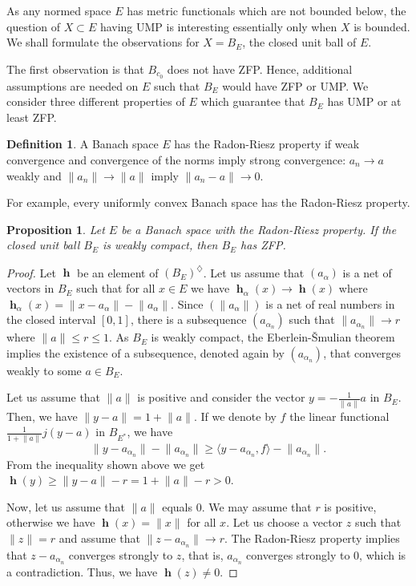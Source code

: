 \documentclass[a4paper,12pt]{article}
\newtheorem{proposition}[theorem]{Proposition}
\theoremstyle{definition}
\newtheorem{definition}[theorem]{Definition}
\numberwithin{equation}{section}
\newcommand{\norm}[1]{\lVert#1\rVert} %
\newcommand{\dpair}[2]{\langle#1, #2\rangle} %
\numberwithin{equation}{section}
\DeclareMathOperator{\h}{\mathbf{h}} %
\begin{document}
As any normed space $E$ has metric functionals which are not 
bounded below, the question of $X\subset E$ having UMP is 
interesting essentially only when $X$ is bounded. We shall 
formulate the observations for $X=B_E$, the closed unit ball 
of $E$. 

The first observation is that $B_{c_0}$ does not have ZFP. 
Hence, additional assumptions are needed on $E$ such that $B_E$ 
would have ZFP or UMP. We consider three different properties 
of $E$ which guarantee that $B_E$ has UMP or at least ZFP.   

\begin{definition}
A Banach space $E$ has the Radon-Riesz property if weak 
convergence and convergence of the norms imply strong 
convergence: $a_n \rightarrow a$ weakly and 
$\norm{a_n} \to \norm{a}$ imply $\norm{a_n - a} \to 0$.
\end{definition}

For example, every uniformly convex Banach space has the 
Radon-Riesz property.

\begin{proposition}
    Let $E$ be a Banach space with the Radon-Riesz property. 
    If the closed unit ball $B_E$ is weakly compact, then 
    $B_E$ has ZFP.
\end{proposition}

\begin{proof} 
Let $\h$ be an element of $(B_E)^\diamondsuit$. 
Let us assume that $(a_\alpha)$ is a net of 
vectors in $B_E$ such that for all $x \in E$ 
we have $\h_\alpha(x) \to \h(x)$ where 
$\h_\alpha(x) = 
\norm{x-a_\alpha}-\norm{a_\alpha}$. 
Since $(\norm{a_\alpha})$ is a net of real 
numbers in the closed interval $[0,1]$, there 
is a subsequence $(a_{\alpha_n})$ such that 
$\norm{a_{\alpha_n}} \to r$ where 
$\norm{a} \leq r \leq 1$.
As $B_E$ is weakly compact, the 
Eberlein-\v{S}mulian theorem \cite{Diestel1984}
implies the existence of a subsequence, denoted 
again by $(a_{\alpha_n})$, that converges 
weakly to some $a \in B_E$. 

Let us assume that $\norm{a}$ is positive 
and consider the vector 
$y= -\frac{1}{\norm{a}}a$ in $B_E$. Then, we 
have $\norm{y-a} = 1 + \norm{a}$. If we 
denote by $f$ the linear functional 
$\frac{1}{1+\norm{a}} j(y-a)$ in $B_{E^*}$, 
we have 
$$
\norm{y - a_{\alpha_n}} -\norm{a_{\alpha_n}}  
    \geq  \dpair{y - a_{\alpha_n}}{f} 
    - \norm{a_{\alpha_n}}.        
$$
From the inequality shown above we get  
$\h(y) \geq \norm{y-a} - r = 1 + \norm{a} - r > 0$.
 
Now, let us assume that $\norm{a}$ equals $0$. 
We may assume that $r$ is positive, otherwise
we have $\h(x) = \norm{x}$ for all $x$. Let 
us choose a vector $z$ such that 
$\norm{z} = r$ and assume that 
$\norm{z - a_{\alpha_n}} \rightarrow r$. The 
Radon-Riesz property implies that 
$z - a_{\alpha_n}$ converges strongly to $z$, 
that is, $a_{\alpha_n}$ converges strongly to 
$0$, which is a contradiction. Thus, we 
have $\h(z) \neq 0$.
\end{proof}
\end{document}
